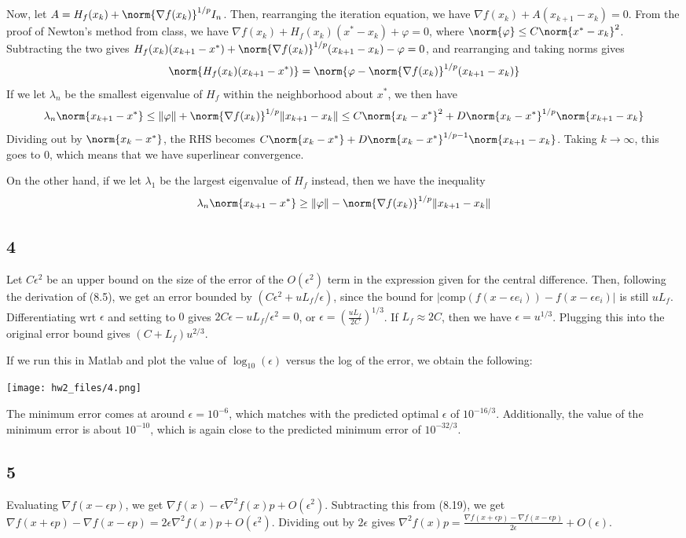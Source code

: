 \documentclass{article}
\newcommand{\ep}{\epsilon}
\begin{document}
Now, let $A=H_f(x_k)+\norm{\nabla f(x_k)}^{1/p}I_n$. Then, rearranging the iteration equation, we have $\nabla f(x_k)+A(x_{k+1}-x_k)=0$. From the proof of Newton's method from class, we have $\nabla f(x_k)+H_f(x_k)(x^*-x_k)+\varphi=0$, where $\norm{\varphi}\leq C\norm{x^*-x_k}^2$. Subtracting the two gives $H_f(x_k)(x_{k+1}-x^*)+\norm{\nabla f(x_k)}^{1/p}(x_{k+1}-x_k)-\varphi=0$, and rearranging and taking norms gives 
\[\norm{H_f(x_k)(x_{k+1}-x^*)}=\norm{\varphi-\norm{\nabla f(x_k)}^{1/p}(x_{k+1}-x_k)}\]
If we let $\lambda_n$ be the smallest eigenvalue of $H_f$ within the neighborhood about $x^*$, we then have
\[\lambda_n\norm{x_{k+1}-x^*}\leq\|\varphi\|+\norm{\nabla f(x_k)}^{1/p}\|x_{k+1}-x_k\|\leq C\norm{x_k-x^*}^2+D\norm{x_k-x^*}^{1/p}\norm{x_{k+1}-x_k}\]
Dividing out by $\norm{x_k-x^*}$, the RHS becomes $C\norm{x_k-x^*}+D\norm{x_k-x^*}^{1/p-1}\norm{x_{k+1}-x_k}$. Taking $k\to\infty$, this goes to $0$, which means that we have superlinear convergence. 

On the other hand, if we let $\lambda_1$ be the largest eigenvalue of $H_f$ instead, then we have the inequality
\[\lambda_n\norm{x_{k+1}-x^*}\geq\|\varphi\|-\norm{\nabla f(x_k)}^{1/p}\|x_{k+1}-x_k\|\]
\subsection*{4}
Let $C\ep^2$ be an upper bound on the size of the error of the $O(\ep^2)$ term in the expression given for the central difference. Then, following the derivation of (8.5), we get an error bounded by $(C\ep^2+uL_f/\ep)$, since the bound for $|\text{comp}(f(x-\ep e_i))-f(x-\ep e_i)|$ is still $uL_f$. Differentiating wrt $\ep$ and setting to $0$ gives $2C\ep-uL_f/\ep^2=0$, or $\ep=\left(\frac{uL_f}{2C}\right)^{1/3}$. If $L_f\approx 2C$, then we have $\ep=u^{1/3}$. Plugging this into the original error bound gives $(C+L_f)u^{2/3}$.

If we run this in Matlab and plot the value of $\log_{10}(\ep)$ versus the log of the error, we obtain the following:

\texttt{[image: hw2\_files/4.png]}

The minimum error comes at around $\ep=10^{-6}$, which matches with the predicted optimal $\ep$ of $10^{-16/3}$. Additionally, the value of the minimum error is about $10^{-10}$, which is again close to the predicted minimum error of $10^{-32/3}$.
\subsection*{5}
Evaluating $\nabla f(x-\ep p)$, we get $\nabla f(x)-\ep\nabla^2 f(x)p+O(\ep^2)$. Subtracting this from (8.19), we get $\nabla f(x+\ep p)-\nabla f(x-\ep p)=2\ep\nabla^2 f(x)p+O(\ep^2)$. Dividing out by $2\ep$ gives $\nabla^2 f(x)p=\frac{\nabla f(x+\ep p)-\nabla f(x-\ep p)}{2\ep}+O(\ep)$.
\end{document}
